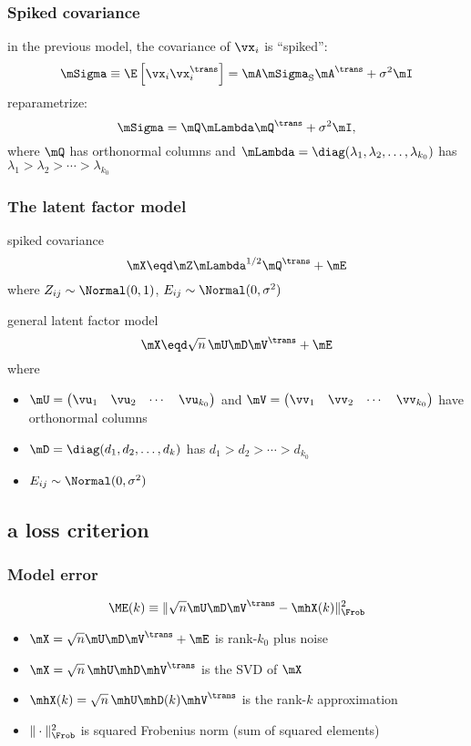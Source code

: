 \documentclass{beamer}
\begin{document}
\begin{frame}
\frametitle{Spiked covariance}
  in the previous model, the covariance of $\vx_i$ is ``spiked'':
  \[
    \mSigma \equiv \E\left[ \vx_i \vx_i^\trans \right] = \mA \mSigma_\text{S} \mA^\trans + \sigma^2 \mI
  \]
  reparametrize:
  \[
    \mSigma = \mQ \mLambda \mQ^\trans + \sigma^2 \mI,
  \]
  where $\mQ$ has orthonormal columns and $\mLambda = \diag( \lambda_1, \lambda_2, \ldots, \lambda_{k_0})$ has $\lambda_1 > \lambda_2 > \cdots > \lambda_{k_0}$
\end{frame}

\begin{frame}
\frametitle{The latent factor model}
  \begin{block}{spiked covariance}
  \[
    \mX \eqd \mZ \mLambda^{1/2} \mQ^\trans + \mE
  \]
  where $Z_{ij} \sim \Normal(0, 1)$, $E_{ij} \sim \Normal(0, \sigma^2)$
  \end{block}
  \begin{block}{general latent factor model}
  \[
    \mX \eqd \sqrt{n} \, \mU \mD \mV^\trans + \mE
  \]
  where
  \begin{itemize}
  \item $\mU = \left(\begin{matrix} \vu_1 & \vu_2 & \cdots & \vu_{k_0}\end{matrix}\right)$
  and $\mV = \left(\begin{matrix} \vv_1 & \vv_2 & \cdots & \vv_{k_0}\end{matrix}\right)$ have orthonormal columns
  \item $\mD = \diag(d_1, d_2, \ldots, d_k)$ has $d_1 > d_2 > \cdots > d_{k_0}$
  \item $E_{ij} \sim \Normal(0, \sigma^2)$
  \end{itemize}
  \end{block}
\end{frame}

\subsection{a loss criterion}

\begin{frame}
  \frametitle{Model error}
  \[
    \ME(k) \equiv \| \sqrt{n} \mU \mD \mV^\trans - \mhX(k) \|_\Frob^2
  \]
  \begin{itemize}
    \item $\mX = \sqrt{n} \mU \mD \mV^\trans + \mE$ is rank-$k_0$ plus noise
    \item $\mX = \sqrt{n} \, \mhU \mhD \mhV^\trans$ is the SVD of $\mX$
    \item $\mhX(k) = \sqrt{n} \, \mhU \mhD(k) \mhV^\trans$ is the rank-$k$ approximation
    \item $\| \cdot \|_\Frob^2$ is squared Frobenius norm (sum of squared elements)
  \end{itemize}
\end{frame}
\end{document}
